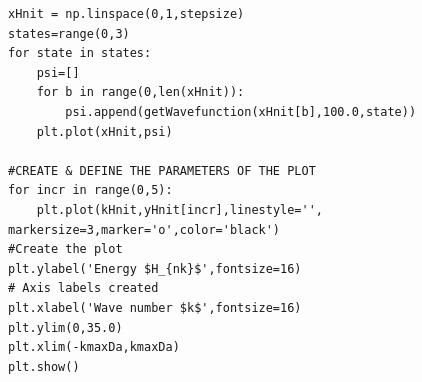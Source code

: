 \documentclass[11pt,a4paper]{article}
\begin{document}
\begin{lstlisting}
xHnit = np.linspace(0,1,stepsize)
states=range(0,3)
for state in states:
    psi=[]   
    for b in range(0,len(xHnit)):
        psi.append(getWavefunction(xHnit[b],100.0,state))
    plt.plot(xHnit,psi)
  
#CREATE & DEFINE THE PARAMETERS OF THE PLOT
for incr in range(0,5):
    plt.plot(kHnit,yHnit[incr],linestyle='', markersize=3,marker='o',color='black')                            #Create the plot
plt.ylabel('Energy $H_{nk}$',fontsize=16)                                     # Axis labels created
plt.xlabel('Wave number $k$',fontsize=16)
plt.ylim(0,35.0)
plt.xlim(-kmaxDa,kmaxDa)
plt.show()
\end{lstlisting}
\end{document}
